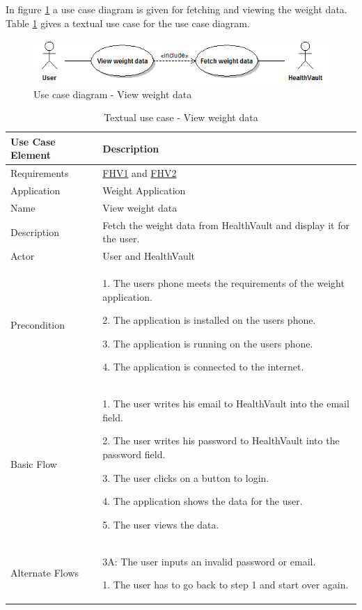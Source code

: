 In figure \ref{figure:use-case-diagram-view-weight} a use case diagram is given for fetching and viewing the weight data.
Table \ref{table:use-case-view-weight-data} gives a textual use case for the use case diagram.

\begin{figure}[H]
\centering
\includegraphics[scale=0.75]{../Figures/use-case-diagram-view-weight.png}
\caption{Use case diagram - View weight data}
\label{figure:use-case-diagram-view-weight}
\end{figure}

\begin{table}[H]
\begin{center}
\begin{tabular}{ l | p{10cm} }
  \hline
  \textbf{Use Case Element} & \textbf{Description} \\ \hline\hline
  Requirements & \hyperref[table:reqweight]{FHV1} and \hyperref[table:reqweight]{FHV2}\\ \hline
  Application & Weight Application \\ \hline
  Name & View weight data \\ \hline
  Description & Fetch the weight data from HealthVault and display it for the user. \\ \hline
  Actor & User and HealthVault \\ \hline
  Precondition &
    \par 1. The users phone meets the requirements of the weight application.
  	\par 2. The application is installed on the users phone.
  	\par 3. The application is running on the users phone.
  	\par 4. The application is connected to the internet.
  \\ \hline
  Basic Flow & 
  	\par 1. The user writes his email to HealthVault into the email field.
  	\par 2. The user writes his password to HealthVault into the password field.
  	\par 3. The user clicks on a button to login.
  	\par 4. The application shows the data for the user.
  	\par 5. The user views the data.
  \\ \hline
  Alternate Flows & 
  	\par 3A: The user inputs an invalid password or email.
  	\par\hspace{15pt} 1. The user has to go back to step 1 and start over again.
  \\ \hline
\end{tabular}
\end{center}
\caption{Textual use case - View weight data}
\label{table:use-case-view-weight-data}
\end{table}


